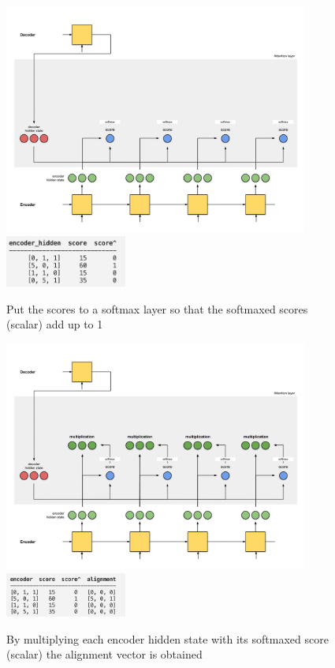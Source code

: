 \documentclass[11pt]{article}
\begin{document}
\begin{figure}[H]
	\centering
	\includegraphics[width=10cm]{seq2seq_attention_score_softmax}
	\includegraphics[width=4cm]{img/seq2seq_attention_scores2}
	\caption{Put the scores to a softmax layer so that the softmaxed scores (scalar) add up to 1}
\end{figure}
\begin{figure}[H]
	\centering
	\includegraphics[width=10cm]{seq2seq_attention_multiplication}
	\includegraphics[width=4cm]{img/seq2seq_attention_alignment}
	\caption{By multiplying each encoder hidden state with its softmaxed score (scalar) the alignment vector is obtained}
\end{figure}
\end{document}
